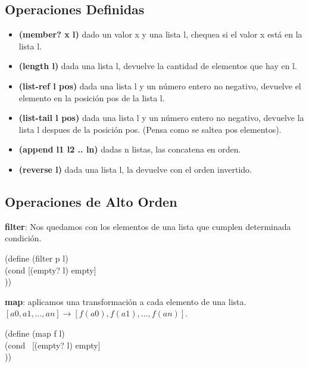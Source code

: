 \documentclass[11pt,a4paper]{article}
\begin{document}
\subsection{Operaciones Definidas}
\begin{itemize}
\item \textbf{(member? x l)} dado un valor x y una lista l, chequea si el valor x está en la lista l.
\item \textbf{(length l)} dada una lista l, devuelve la cantidad de elementos que hay en l.
\item \textbf{(list-ref l pos)} dada una lista l y un n\'umero entero no negativo, devuelve el elemento en la posici\'on pos de la lista l.
\item \textbf{(list-tail l pos)} dada una lista l y un n\'umero entero no negativo, devuelve la lista l despues de la posici\'on pos. (Pensa como se saltea pos elementos).
\item \textbf{(append l1 l2 .. ln)} dadas n listas, las concatena en orden.
\item \textbf{(reverse l)} dada una lista l, la devuelve con el orden invertido.
\end{itemize}

\subsection{Operaciones de Alto Orden}
\textbf{filter}: Nos quedamos con los elementos de una lista que cumplen determinada condici\'on.
\begin{siderules}
(define (filter p l)\\
\indent \indent \indent (cond [(empty? l) empty]\\
\indent \indent \indent \indent {}))
\end{siderules}

\noindent \textbf{map}: aplicamos una transformaci\'on a cada elemento de una lista. $[a0, a1, ..., an] \rightarrow [f(a0), f(a1), ..., f(an)]$.
\begin{siderules}
(define (map f l)\\
\indent \indent \indent (cond \ [(empty? l) empty]\\
\indent \indent \indent \indent {}))
\end{siderules}
\end{document}
